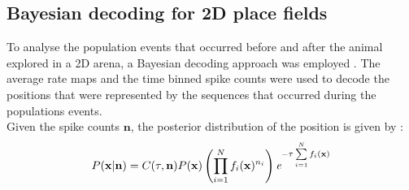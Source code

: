\subsection{Bayesian decoding for 2D place fields}
To analyse the population events that occurred before and after the animal explored in a 2D arena, a Bayesian decoding approach was employed \cite{Zhang2013}. The average rate maps and the time binned spike counts were used to decode the positions that were represented by the sequences that occurred during the populations events. \\
Given the spike counts $\mathbf{n}$, the posterior distribution of the position is given by : 
\[ 
P( \mathbf{x} | \mathbf{n}) = C(\tau, \mathbf{n}) P(\mathbf{x}) \left(\prod_{i = 1}^{N} f_{i}(\mathbf{x})^{n_i} \right) \emph{e}^{-\tau \sum\limits_{i = 1}^{N} f_{i}(\mathbf{x}) }
 \]


	
